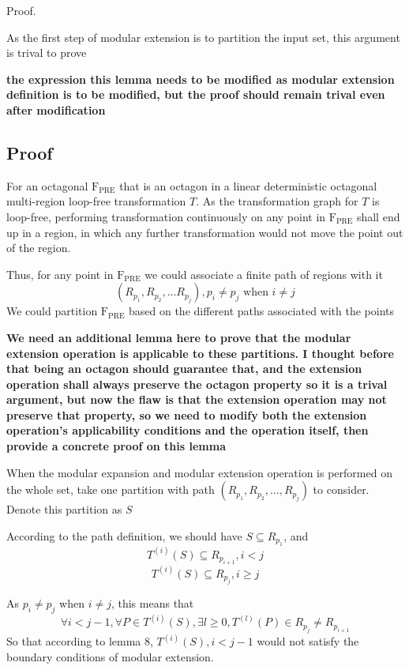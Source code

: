\documentclass[letterpaper,]{article}
\begin{document}
Proof.

As the first step of modular extension is to partition the input set,
this argument is trival to prove

\textbf{the expression this lemma needs to be modified as modular
extension definition is to be modified, but the proof should remain
trival even after modification}

\hypertarget{proof-1}{%
\subsection{Proof}\label{proof-1}}

For an octagonal \(\mathrm{F_{PRE}}\) that is an octagon in a linear
deterministic octagonal multi-region loop-free transformation \(T\). As
the transformation graph for \(T\) is loop-free, performing
transformation continuously on any point in \(\mathrm{F_{PRE}}\) shall
end up in a region, in which any further transformation would not move
the point out of the region.

Thus, for any point in \(\mathrm{F_{PRE}}\) we could associate a finite
path of regions with it
\[(R_{p_1}, R_{p_2}, \dots R_{p_j}), p_i \neq p_j \text{ when } i\neq j \]
We could partition \(\mathrm{F_{PRE}}\) based on the different paths
associated with the points

\textbf{We need an additional lemma here to prove that the modular
extension operation is applicable to these partitions. I thought before
that being an octagon should guarantee that, and the extension operation
shall always preserve the octagon property so it is a trival argument,
but now the flaw is that the extension operation may not preserve that
property, so we need to modify both the extension operation's
applicability conditions and the operation itself, then provide a
concrete proof on this lemma}

When the modular expansion and modular extension operation is performed
on the whole set, take one partition with path
\((R_{p_1}, R_{p_2}, \dots, R_{p_j})\) to consider. Denote this
partition as \(S\)

According to the path definition, we should have
\(S \subseteq R_{p_1}\), and \[T^{(i)}(S) \subseteq R_{p_{i+1}}, i < j\]
\[T^{(i)}(S) \subseteq R_{p_j}, i \ge j\]

As \(p_i \neq p_j\) when \(i \neq j\), this means that
\[\forall i < j - 1, \forall P \in T^{(i)}(S), \exists l \ge 0, T^{(l)}(P) \in R_{p_j} \neq R_{p_{i + 1}}\]
So that according to lemma 8, \(T^{(i)}(S), i < j - 1\) would not
satisfy the boundary conditions of modular extension.
\end{document}
